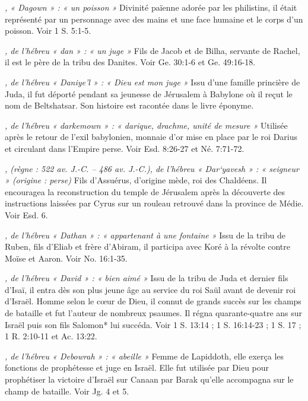 \begin{multicols}{2}
\textit{, « Dagown » : « un poisson »}\newline
Divinité païenne adorée par les philistins, il était représenté par un personnage avec des mains et une face humaine et le corps d'un poisson. Voir 1 S. 5:1-5.

\textit{, de l'hébreu « dan » : « un juge »}\newline
Fils de Jacob et de Bilha, servante de Rachel, il est le père de la tribu des Danites. Voir Ge. 30:1-6 et Ge. 49:16-18.

\textit{, de l'hébreu « Daniye'l » : « Dieu est mon juge »}\newline
Issu d'une famille princière de Juda, il fut déporté pendant sa jeunesse de Jérusalem à Babylone où il reçut le nom de Beltshatsar. Son histoire est racontée dans le livre éponyme.

\textit{, de l'hébreu « darkemown » : « darique, drachme, unité de mesure »}\newline
Utilisée après le retour de l'exil babylonien, monnaie d'or mise en place par le roi Darius et circulant dans l'Empire perse. Voir Esd. 8:26-27 et Né. 7:71-72.

\textit{, (règne : 522 av. J.-C. – 486 av. J.-C.), de l'hébreu « Dar`yavesh » : « seigneur » (origine : perse)}\newline
Fils d'Assuérus, d'origine mède, roi des Chaldéens. Il encouragea la reconstruction du temple de Jérusalem après la découverte des instructions laissées par Cyrus sur un rouleau retrouvé dans la province de Médie. Voir Esd. 6.

\textit{, de l'hébreu « Dathan » : « appartenant à une fontaine »}\newline
Issu de la tribu de Ruben, fils d'Eliab et frère d'Abiram, il participa avec Koré à la révolte contre Moïse et Aaron. Voir No. 16:1-35.

\textit{, de l'hébreu « David » : « bien aimé »}\newline
Issu de la tribu de Juda et dernier fils d'Isaï, il entra dès son plus jeune âge au service du roi Saül avant de devenir roi d'Israël. Homme selon le cœur de Dieu, il connut de grands succès sur les champs de bataille et fut l'auteur de nombreux psaumes. Il régna quarante-quatre ans sur Israël puis son fils Salomon* lui succéda. Voir 1 S. 13:14 ; 1 S. 16:14-23 ; 1 S. 17 ; 1 R. 2:10-11 et Ac. 13:22.

\textit{, de l'hébreu « Debowrah » : « abeille »}\newline
Femme de Lapiddoth, elle exerça les fonctions de prophétesse et juge en Israël. Elle fut utilisée par Dieu pour prophétiser la victoire d'Israël sur Canaan par Barak qu'elle accompagna sur le champ de bataille. Voir Jg. 4 et 5.


\end{multicols}
